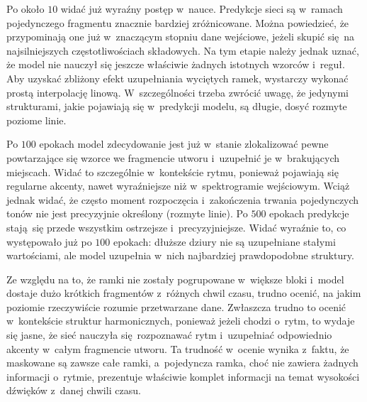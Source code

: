 Po około $10$ widać już wyraźny postęp w~nauce. Predykcje sieci są w~ramach pojedynczego fragmentu znacznie bardziej zróżnicowane. Można powiedzieć, że przypominają one już w~znaczącym stopniu dane wejściowe, jeżeli skupić się na najsilniejszych częstotliwościach składowych. Na tym etapie należy jednak uznać, że model nie nauczył się jeszcze właściwie żadnych istotnych wzorców i~reguł. Aby uzyskać zbliżony efekt uzupełniania wyciętych ramek, wystarczy wykonać prostą interpolację linową. W~szczególności trzeba zwrócić uwagę, że jedynymi strukturami, jakie pojawiają się w~predykcji modelu, są długie, dosyć rozmyte poziome linie.

Po $100$ epokach model zdecydowanie jest już w~stanie zlokalizować pewne powtarzające się wzorce we fragmencie utworu i~uzupełnić je w~brakujących miejscach. Widać to szczególnie w~kontekście rytmu, ponieważ pojawiają się regularne akcenty, nawet wyraźniejsze niż w~spektrogramie wejściowym. Wciąż jednak widać, że często moment rozpoczęcia i~zakończenia trwania pojedynczych tonów nie jest precyzyjnie określony (rozmyte linie). Po $500$ epokach predykcje stają się przede wszystkim ostrzejsze i~precyzyjniejsze. Widać wyraźnie to, co występowało już po $100$ epokach: dłuższe dziury nie są uzupełniane stałymi wartościami, ale model uzupełnia w~nich najbardziej prawdopodobne struktury.

Ze względu na to, że ramki nie zostały pogrupowane w~większe bloki i~model dostaje dużo krótkich fragmentów z~różnych chwil czasu, trudno ocenić, na jakim poziomie rzeczywiście rozumie przetwarzane dane. Zwłaszcza trudno to ocenić w~kontekście struktur harmonicznych, ponieważ jeżeli chodzi o~rytm, to wydaje się jasne, że sieć nauczyła się rozpoznawać rytm i~uzupełniać odpowiednio akcenty w~całym fragmencie utworu. Ta trudność w~ocenie wynika z~faktu, że maskowane są zawsze całe ramki, a~pojedyncza ramka, choć nie zawiera żadnych informacji o~rytmie, prezentuje właściwie komplet informacji na temat wysokości dźwięków z~danej chwili czasu.

